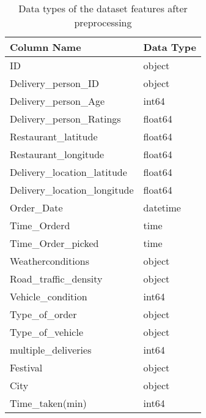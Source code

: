 \documentclass[10pt,twocolumn,letterpaper]{article}
\begin{document}
        \begin{table}[h]
            \centering
            \begin{tabular}{|l|l|}
                \hline
                \textbf{Column Name}               & \textbf{Data Type} \\
                \hline
                ID                                 & object             \\
                Delivery\_person\_ID               & object             \\
                Delivery\_person\_Age              & int64              \\
                Delivery\_person\_Ratings          & float64            \\
                Restaurant\_latitude               & float64            \\
                Restaurant\_longitude              & float64            \\
                Delivery\_location\_latitude       & float64            \\
                Delivery\_location\_longitude      & float64            \\
                Order\_Date                        & datetime           \\
                Time\_Orderd                       & time               \\
                Time\_Order\_picked                & time               \\
                Weatherconditions                  & object             \\
                Road\_traffic\_density             & object             \\
                Vehicle\_condition                 & int64              \\
                Type\_of\_order                    & object             \\
                Type\_of\_vehicle                  & object             \\
                multiple\_deliveries               & int64              \\
                Festival                           & object             \\
                City                               & object             \\
                Time\_taken(min)                   & int64              \\
                \hline
            \end{tabular}
            \caption{Data types of the dataset features after preprocessing}
            \label{tab:dataset_dtypes}
        \end{table}
\end{document}
